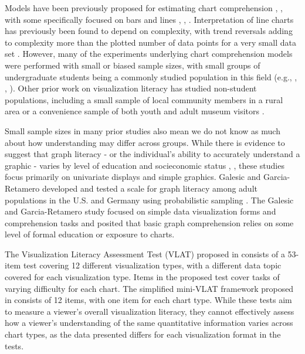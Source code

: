 \documentclass{IEEEcsmag}
\begin{document}
Models have been previously proposed for estimating chart comprehension , , with some specifically focused on bars and lines , , . Interpretation of line charts has previously been found to depend on complexity, with trend reversals adding to complexity more than the plotted number of data points for a very small data set . However, many of the experiments underlying chart comprehension models were performed with small or biased sample sizes, with small groups of undergraduate students being a commonly studied population in this field (e.g., , , ). Other prior work on visualization literacy has studied non-student populations, including a small sample of local community members in a rural area  or a convenience sample of both youth and adult museum visitors .

Small sample sizes in many prior studies also mean we do not know as much about how understanding may differ across groups. While there is evidence to suggest that graph literacy - or the individual's ability to accurately understand a graphic - varies by level of education and socieconomic status , , these studies focus primarily on univariate displays and simple graphics. Galesic and Garcia-Retamero developed and tested a scale for graph literacy among adult populations in the U.S. and Germany using probabilistic sampling . The Galesic and Garcia-Retamero study focused on simple data visualization forms and comprehension tasks and posited that basic graph comprehension relies on some level of formal education or exposure to charts.

The Visualization Literacy Assessment Test (VLAT) proposed in  consists of a 53-item test covering 12 different visualization types, with a different data topic covered for each visualization type. Items in the proposed test cover tasks of varying difficulty for each chart. The simplified mini-VLAT framework proposed in  consists of 12 items, with one item for each chart type. While these tests aim to measure a viewer's overall visualization literacy, they cannot effectively assess how a viewer's understanding of the same quantitative information varies across chart types, as the data presented differs for each visualization format in the tests.
\end{document}
